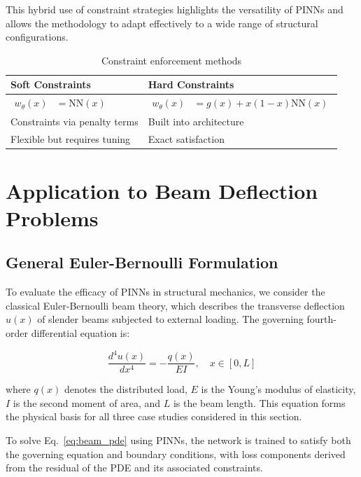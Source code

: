 \documentclass[12pt]{article}
\begin{document}
This hybrid use of constraint strategies highlights the versatility of PINNs and allows the methodology to adapt effectively to a wide range of structural configurations.

\begin{table}[htbp]
	\centering
	\begin{tabular}{p{}p{}}
		\toprule
		\textbf{Soft Constraints} & \textbf{Hard Constraints} \\
		\midrule
		$\begin{aligned}
			w_{\theta}(x) &= \text{NN}(x)
		\end{aligned}$ & $\begin{aligned}
			w_{\theta}(x) &= g(x) + x(1-x)\text{NN}(x)
		\end{aligned}$ \\
		Constraints via penalty terms & Built into architecture \\
		Flexible but requires tuning & Exact satisfaction \\
		\bottomrule
	\end{tabular}
	\caption{Constraint enforcement methods}
	\label{tab:constraints}
\end{table}


\section{Application to Beam Deflection Problems}
\subsection{General Euler-Bernoulli Formulation}

To evaluate the efficacy of PINNs in structural mechanics, we consider the classical Euler-Bernoulli beam theory, which describes the transverse deflection $u(x)$ of slender beams subjected to external loading. The governing fourth-order differential equation is:

\begin{equation}
\frac{d^4 u(x)}{dx^4} = -\frac{q(x)}{EI}, \quad x \in [0, L]
\label{eq:beam_pde}
\end{equation}

where $q(x)$ denotes the distributed load, $E$ is the Young’s modulus of elasticity, $I$ is the second moment of area, and $L$ is the beam length. This equation forms the physical basis for all three case studies considered in this section.

\vspace{0.5em}
To solve Eq.~\eqref{eq:beam_pde} using PINNs, the network is trained to satisfy both the governing equation and boundary conditions, with loss components derived from the residual of the PDE and its associated constraints.
\end{document}
